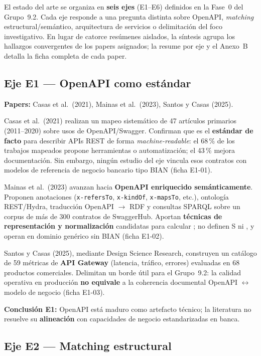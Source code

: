El estado del arte se organiza en \textbf{seis ejes} (E1--E6) definidos en la Fase~0 del Grupo~9.2.
Cada eje responde a una pregunta distinta sobre OpenAPI, \textit{matching} estructural/semántico,
arquitectura de servicios o delimitación del foco investigativo. En lugar de catorce resúmenes
aislados, la síntesis agrupa los hallazgos convergentes de los papers asignados; la
 resume por eje y el Anexo~B detalla la ficha completa de cada paper.

\subsection{Eje E1 --- OpenAPI como estándar}

\textbf{Papers:} Casas et al.\ (2021), Mainas et al.\ (2023), Santos y Casas (2025).

Casas et al.\ (2021) realizan un mapeo sistemático de 47 artículos primarios (2011--2020) sobre
usos de OpenAPI/Swagger. Confirman que es el \textbf{estándar de facto} para describir APIs REST de
forma \textit{machine-readable}: el 68\,\% de los trabajos mapeados propone herramientas o
automatización; el 43\,\% mejora documentación. Sin embargo, ningún estudio del eje vincula esos
contratos con modelos de referencia de negocio bancario tipo BIAN (ficha E1-01).

Mainas et al.\ (2023) avanzan hacia \textbf{OpenAPI enriquecido semánticamente}. Proponen
anotaciones (\texttt{x-refersTo}, \texttt{x-kindOf}, \texttt{x-mapsTo}, etc.), ontología REST/Hydra,
traducción OpenAPI $\rightarrow$ RDF y consultas SPARQL sobre un corpus de más de 300 contratos de
SwaggerHub. Aportan \textbf{técnicas de representación y normalización} candidatas para calcular
\SemanticScore{}; no definen S ni \AlignmentScore{}, y operan en dominio genérico sin
\ServiceDomain{} BIAN (ficha E1-02).

Santos y Casas (2025), mediante Design Science Research, construyen un catálogo de 59 métricas de
\textbf{API Gateway} (latencia, tráfico, errores) evaluadas en 68 productos comerciales. Delimitan un
borde útil para el Grupo~9.2: la calidad operativa en producción \textbf{no equivale} a la coherencia
documental OpenAPI $\leftrightarrow$ modelo de negocio (ficha E1-03).

\textbf{Conclusión E1:} OpenAPI está maduro como artefacto técnico; la literatura no resuelve su
\textbf{alineación} con capacidades de negocio estandarizadas en banca.

\subsection{Eje E2 --- Matching estructural}

